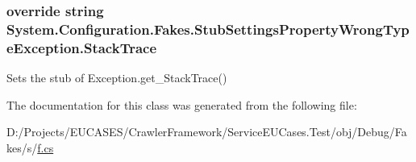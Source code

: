 \hypertarget{class_system_1_1_configuration_1_1_fakes_1_1_stub_settings_property_wrong_type_exception_af62141935e8717ff1885ca0fd8544787}{
\subsubsection[{Stack\-Trace}]{\setlength{\rightskip}{0pt plus 5cm}override string System.\-Configuration.\-Fakes.\-Stub\-Settings\-Property\-Wrong\-Type\-Exception.\-Stack\-Trace\hspace{0.3cm}{\ttfamily [get]}}}\label{class_system_1_1_configuration_1_1_fakes_1_1_stub_settings_property_wrong_type_exception_af62141935e8717ff1885ca0fd8544787}


Sets the stub of Exception.\-get\-\_\-\-Stack\-Trace()



The documentation for this class was generated from the following file\-:\begin{DoxyCompactItemize}
\item 
D\-:/\-Projects/\-E\-U\-C\-A\-S\-E\-S/\-Crawler\-Framework/\-Service\-E\-U\-Cases.\-Test/obj/\-Debug/\-Fakes/s/\hyperlink{s_2f_8cs}{f.\-cs}\end{DoxyCompactItemize}
